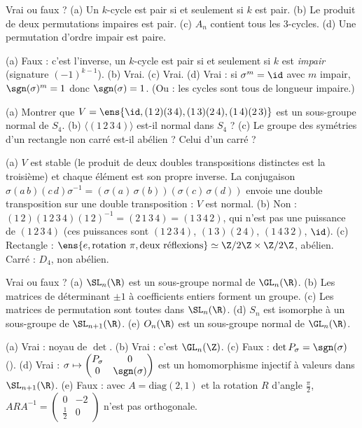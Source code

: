 \begin{exo}
Vrai ou faux ? (a) Un $k$-cycle est pair si et seulement si $k$ est pair. (b) Le produit de deux permutations impaires est pair. (c) $A_n$ contient tous les 3-cycles. (d) Une permutation d'ordre impair est paire.
\begin{corrige}
(a) Faux : c'est l'inverse, un $k$-cycle est pair si et seulement si $k$ est \emph{impair} (signature $(-1)^{k-1}$). (b) Vrai. (c) Vrai. (d) Vrai : si $\sigma^m=\id$ avec $m$ impair, $\sgn(\sigma)^m=1$ donc $\sgn(\sigma)=1$. (Ou : les cycles sont tous de longueur impaire.)
\end{corrige}
\end{exo}
\begin{exo}
(a) Montrer que $V=\ens{\id,(1\,2)(3\,4),(1\,3)(2\,4),(1\,4)(2\,3)}$ est un sous-groupe normal de $S_4$. (b) $\langle(1\,2\,3\,4)\rangle$ est-il normal dans $S_4$ ? (c) Le groupe des symétries d'un rectangle non carré est-il abélien ? Celui d'un carré ?
\begin{corrige}
(a) $V$ est stable (le produit de deux doubles transpositions distinctes est la troisième) et chaque élément est son propre inverse. La conjugaison $\sigma(a\,b)(c\,d)\sigma^{-1}=(\sigma(a)\,\sigma(b))(\sigma(c)\,\sigma(d))$ envoie une double transposition sur une double transposition : $V$ est normal.
(b) Non : $(1\,2)(1\,2\,3\,4)(1\,2)^{-1}=(2\,1\,3\,4)=(1\,3\,4\,2)$, qui n'est pas une puissance de $(1\,2\,3\,4)$ (ces puissances sont $(1\,2\,3\,4)$, $(1\,3)(2\,4)$, $(1\,4\,3\,2)$, $\id$).
(c) Rectangle : $\ens{e,\text{rotation }\pi,\text{deux réflexions}}\simeq\Z/2\Z\times\Z/2\Z$, abélien. Carré : $D_4$, non abélien.
\end{corrige}
\end{exo}
\begin{exo}
Vrai ou faux ? (a) $\SL_n(\R)$ est un sous-groupe normal de $\GL_n(\R)$. (b) Les matrices de déterminant $\pm1$ à coefficients entiers forment un groupe. (c) Les matrices de permutation sont toutes dans $\SL_n(\R)$. (d) $S_n$ est isomorphe à un sous-groupe de $\SL_{n+1}(\R)$. (e) $O_n(\R)$ est un sous-groupe normal de $\GL_n(\R)$.
\begin{corrige}
(a) Vrai : noyau de $\det$. (b) Vrai : c'est $\GL_n(\Z)$. (c) Faux : $\det P_\sigma=\sgn(\sigma)$ (). (d) Vrai : $\sigma\mapsto\begin{pmatrix}P_\sigma&0\\0&\sgn(\sigma)\end{pmatrix}$ est un homomorphisme injectif à valeurs dans $\SL_{n+1}(\R)$. (e) Faux : avec $A=\mathrm{diag}(2,1)$ et la rotation $R$ d'angle $\frac\pi2$, $ARA^{-1}=\begin{pmatrix}0&-2\\\frac12&0\end{pmatrix}$ n'est pas orthogonale.
\end{corrige}
\end{exo}

